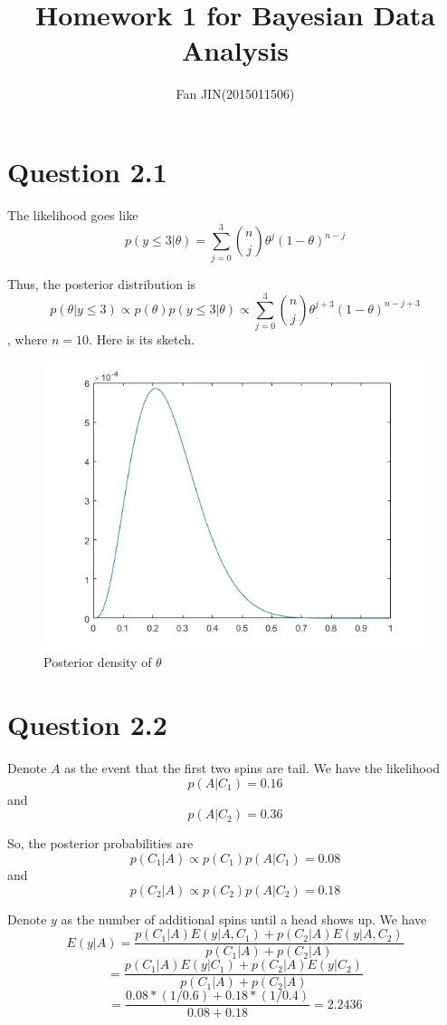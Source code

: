 \documentclass{article}
\begin{document}
\title{\textsf{Homework 1 for Bayesian Data Analysis}}
\author{Fan JIN\quad (2015011506)}
\maketitle

\section*{Question 2.1}
{
    The likelihood goes like $$p{(y\le 3 | \theta)} = \sum_{j=0}^{3} {\binom{n}{j} \theta^{j} (1-\theta)^{n-j}}$$

    Thus, the posterior distribution is $$p{(\theta | y\le 3)} \propto p{(\theta)} p{(y\le 3 | \theta)} \propto \sum_{j=0}^{3} {\binom{n}{j} \theta^{j+3} (1-\theta)^{n-j+3}}$$, where $n=10$. Here is its sketch.

    \begin{figure}[H]
        \centering
        \includegraphics[width = 0.7\linewidth]{1.png}
        \caption{Posterior density of $\theta$}
    \end{figure}
}

\section*{Question 2.2}
{
    Denote $A$ as the event that the first two spins are tail. We have the likelihood $$p{(A | C_1)} = 0.16$$ and $$p{(A | C_2)} = 0.36$$

    So, the posterior probabilities are $$p{(C_1 | A)} \propto p{(C_1)} p{(A | C_1)} = 0.08$$ and $$p{(C_2 | A)} \propto p{(C_2)} p{(A | C_2)} = 0.18$$ 

    Denote $y$ as the number of additional spins until a head shows up. We have $$E{(y | A)} = \frac{p{(C_1 | A)} E{(y | A, C_1)} + p{(C_2 | A)} E{(y | A, C_2)}}{p{(C_1 | A)} + p{(C_2 | A)}} $$ $$= \frac{p{(C_1 | A)} E{(y | C_1)} + p{(C_2 | A)} E{(y | C_2)}}{p{(C_1 | A)} + p{(C_2 | A)}} $$ $$= \frac{0.08 * (1/0.6) + 0.18 * (1/0.4)}{0.08 + 0.18} = 2.2436$$
}
\end{document}
